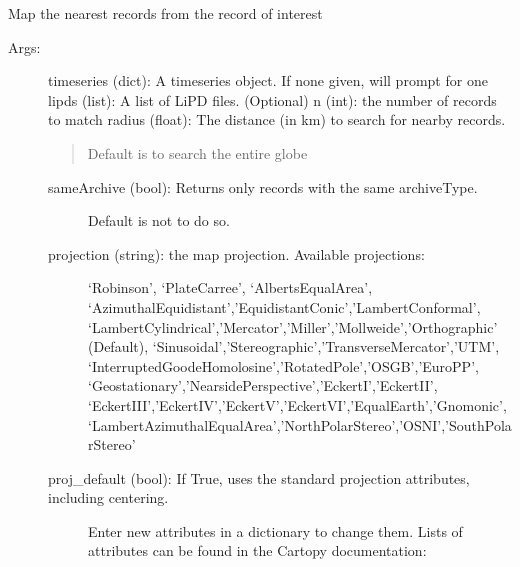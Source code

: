 \documentclass[letterpaper,10pt,english]{sphinxmanual}
\begin{document}
\begin{fulllineitems}
\label{\detokenize{Main:pyleoclim.mapNearRecords}}
Map the nearest records from the record of interest
\begin{description}
\item[{Args:}] \leavevmode
timeseries (dict): A timeseries object. If none given, will prompt for one
lipds (list): A list of LiPD files. (Optional)
n (int): the number of records to match
radius (float): The distance (in km) to search for nearby records.
\begin{quote}

Default is to search the entire globe
\end{quote}
\begin{description}
\item[{sameArchive (bool): Returns only records with the same archiveType.}] \leavevmode
Default is not to do so.

\item[{projection (string): the map projection. Available projections:}] \leavevmode
‘Robinson’, ‘PlateCarree’, ‘AlbertsEqualArea’,
‘AzimuthalEquidistant’,’EquidistantConic’,’LambertConformal’,
‘LambertCylindrical’,’Mercator’,’Miller’,’Mollweide’,’Orthographic’ (Default),
‘Sinusoidal’,’Stereographic’,’TransverseMercator’,’UTM’,
‘InterruptedGoodeHomolosine’,’RotatedPole’,’OSGB’,’EuroPP’,
‘Geostationary’,’NearsidePerspective’,’EckertI’,’EckertII’,
‘EckertIII’,’EckertIV’,’EckertV’,’EckertVI’,’EqualEarth’,’Gnomonic’,
‘LambertAzimuthalEqualArea’,’NorthPolarStereo’,’OSNI’,’SouthPolarStereo’

\item[{proj\_default (bool): If True, uses the standard projection attributes, including centering.}] \leavevmode
Enter new attributes in a dictionary to change them. Lists of attributes
can be found in the Cartopy documentation:
\begin{quote}

\end{quote}


\end{description}
\end{description}
\end{fulllineitems}
\end{document}
